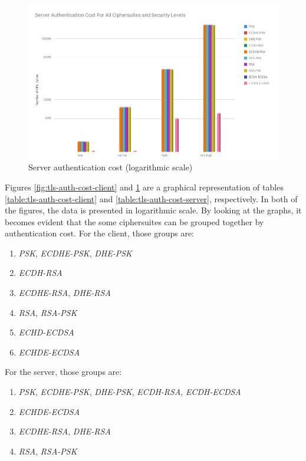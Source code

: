 \documentclass{llncs}
\begin{document}
\begin{figure}
  \centering
  \includegraphics[width=1.0\textwidth]{img/tls-server-auth-cost.png}
  \centering \caption{\label{fig:tls-auth-cost-server} Server authentication cost (logarithmic scale)}
\end{figure}


Figures \ref{fig:tls-auth-cost-client} and \ref{fig:tls-auth-cost-server} are a graphical representation of tables \ref{table:tls-auth-cost-client} and \ref{table:tls-auth-cost-server},
respectively. In both of the figures, the data is presented in logarithmic scale. By looking at the graphs, it becomes evident that the some ciphersuites can be grouped together by authentication cost.
For the client, those groups are:

\begin{enumerate}
  \item \textit{PSK}, \textit{ECDHE-PSK}, \textit{DHE-PSK}
  \item \textit{ECDH-RSA}
  \item \textit{ECDHE-RSA}, \textit{DHE-RSA}
  \item \textit{RSA}, \textit{RSA-PSK}
  \item \textit{ECHD-ECDSA}
  \item \textit{ECHDE-ECDSA}
\end{enumerate}

For the server, those groups are:

\begin{enumerate}
  \item \textit{PSK}, \textit{ECDHE-PSK}, \textit{DHE-PSK}, \textit{ECDH-RSA}, \textit{ECDH-ECDSA}
  \item \textit{ECHDE-ECDSA}
  \item \textit{ECDHE-RSA}, \textit{DHE-RSA}
  \item \textit{RSA}, \textit{RSA-PSK}
\end{enumerate}
\end{document}

